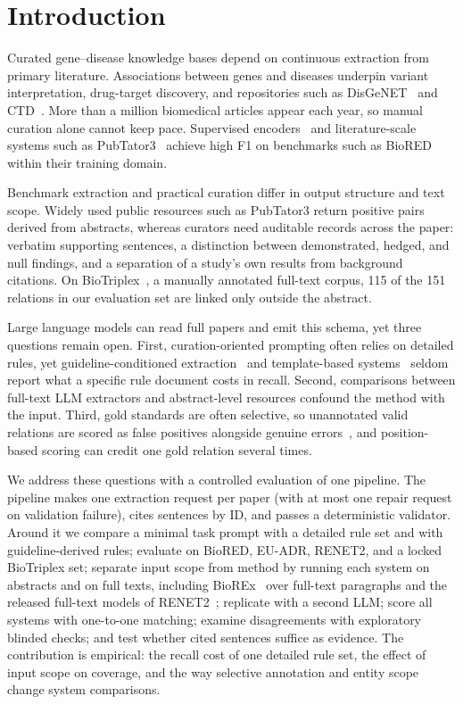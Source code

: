 \documentclass[preprint,10pt,letterpaper]{elsarticle}
\begin{document}
\section{Introduction}

Curated gene--disease knowledge bases depend on continuous extraction from primary literature. Associations between genes and diseases underpin variant interpretation, drug-target discovery, and repositories such as DisGeNET~\cite{pinero2020disgenet} and CTD~\cite{davis2023ctd}. More than a million biomedical articles appear each year, so manual curation alone cannot keep pace. Supervised encoders~\cite{lee2020biobert,gu2021pubmedbert,lai2023biorex} and literature-scale systems such as PubTator3~\cite{wei2024pubtator3} achieve high F1 on benchmarks such as BioRED~\cite{luo2022biored} within their training domain.

Benchmark extraction and practical curation differ in output structure and text scope. Widely used public resources such as PubTator3 return positive pairs derived from abstracts, whereas curators need auditable records across the paper: verbatim supporting sentences, a distinction between demonstrated, hedged, and null findings, and a separation of a study's own results from background citations. On BioTriplex~\cite{collins2026biotriplex}, a manually annotated full-text corpus, 115 of the 151 relations in our evaluation set are linked only outside the abstract.

Large language models can read full papers and emit this schema, yet three questions remain open. First, curation-oriented prompting often relies on detailed rules, yet guideline-conditioned extraction~\cite{sainz2024gollie} and template-based systems~\cite{caufield2024spires} seldom report what a specific rule document costs in recall. Second, comparisons between full-text LLM extractors and abstract-level resources confound the method with the input. Third, gold standards are often selective, so unannotated valid relations are scored as false positives alongside genuine errors~\cite{wadhwa2023revisiting,fan2024evaluating}, and position-based scoring can credit one gold relation several times.

We address these questions with a controlled evaluation of one pipeline. The pipeline makes one extraction request per paper (with at most one repair request on validation failure), cites sentences by ID, and passes a deterministic validator. Around it we compare a minimal task prompt with a detailed rule set and with guideline-derived rules; evaluate on BioRED, EU-ADR, RENET2, and a locked BioTriplex set; separate input scope from method by running each system on abstracts and on full texts, including BioREx~\cite{lai2023biorex} over full-text paragraphs and the released full-text models of RENET2~\cite{su2021renet2}; replicate with a second LLM; score all systems with one-to-one matching; examine disagreements with exploratory blinded checks; and test whether cited sentences suffice as evidence. The contribution is empirical: the recall cost of one detailed rule set, the effect of input scope on coverage, and the way selective annotation and entity scope change system comparisons.
\end{document}
